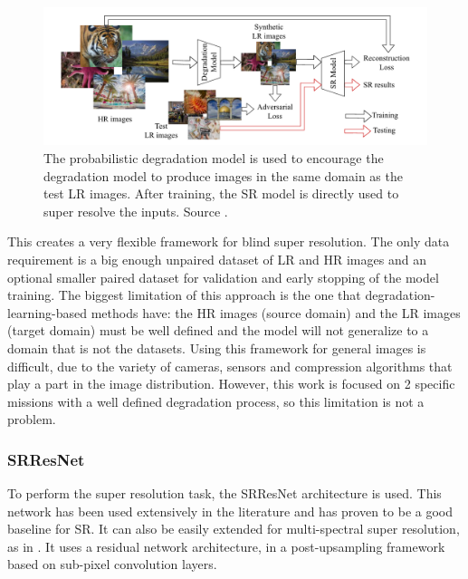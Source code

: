     \begin{figure}[H]
        \centering
        \includegraphics[width=\textwidth]{Includes/3-GAN-degradation-model.png}
        \caption{The probabilistic degradation model is used to encourage the degradation model to produce images in the same domain as the test LR images.
                After training, the SR model is directly used to super resolve the inputs.
                Source \cite{luo2022learning}.}
        \label{fig:3-GAN-degradation-model}
    \end{figure}

    This creates a very flexible framework for blind super resolution. 
    The only data requirement is a big enough unpaired dataset of LR and HR images and an optional smaller paired dataset for validation and early stopping of the model training.
    The biggest limitation of this approach is the one that degradation-learning-based methods have: the HR images (source domain) and the LR images (target domain) must be well defined and the model will not generalize to a domain that is not the datasets. 
    Using this framework for general images is difficult, due to the variety of cameras, sensors and compression algorithms that play a part in the image distribution. However, this work is focused on 2 specific missions with a well defined degradation process, so this limitation is not a problem.


\subsubsection{SRResNet}

    
    To perform the super resolution task, the SRResNet architecture is used. This network has been used extensively in the literature and has proven to be a good baseline for SR. It can also be easily extended for multi-spectral super resolution, as in \cite{myself2023}. It uses a residual network architecture, in a post-upsampling framework based on sub-pixel convolution layers.
    
